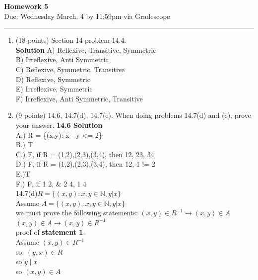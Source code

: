 \documentclass[12pt]{article}
\begin{document}
\begin{center}
  \textbf{\Large Homework 5} \\
Due: Wednesday  March. 4 by 11:59pm
via Gradescope
\end{center}

\hrule

\vspace{0.25in}

\begin{enumerate}
\item (18 points) Section 14 problem 14.4.  \\
\textbf{Solution}
 A) Reflexive, Transitive, Symmetric \\
 B) Irreflexive, Anti Symmetric  \\ 
 C) Reflexive, Symmetric, Transitive  \\
 D) Reflexive, Symmetric  \\
 E) Irreflexive, Symmetric  \\
 F) Irreflexive, Anti Symmetric, Transitive  \\


\item (9 points)  14.6, 14.7(d), 14.7(e).  When doing problems 14.7(d) and (e), prove your answer.
\textbf{14.6 Solution} \\ 
A.) R = \{(x,y): \mid x - y \mid <= 2\} \\
B.) T \\
C.) F, if R = {(1,2),(2,3),(3,4)}, then 12, 23, 34 \\
D.) F, if R = {(1,2),(2,3),(3,4)}, then 12, 1 != 2 \\
E.)T \\
F.) F, if 1  2, & 2 4, 1 \not{} 4 \\

14.7(d)$R=\{(x,y):x,y \in \mathbb{N},y|x \} $\\

Assume $A=\{(x,y):x,y \in \mathbb{N},y|x \} $\\
we must prove the following statements:
$(x,y) \in R^{-1} \rightarrow (x,y) \in A $\\
$(x,y) \in A \rightarrow (x,y) \in R^{-1} $\\

proof of \textbf{statement 1}:\\
Assume $(x,y) \in R^{-1}$\\
so, $(y,x) \in R$\\
so $y \mid x$\\
so $(x,y) \in A$\\


\end{enumerate}
\end{document}
